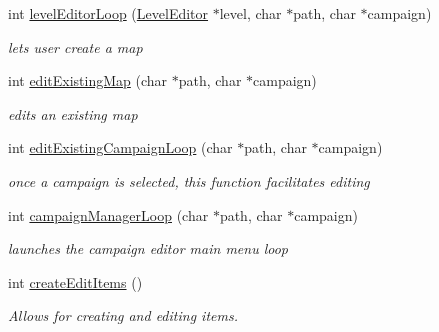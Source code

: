 \begin{DoxyCompactItemize}
\hypertarget{class_game_loops_acda39f058e280040296d03f306fbb5f8}{}\label{class_game_loops_acda39f058e280040296d03f306fbb5f8} 
int \hyperlink{class_game_loops_acda39f058e280040296d03f306fbb5f8}{level\+Editor\+Loop} (\hyperlink{class_level_editor}{Level\+Editor} $\ast$level, char $\ast$path, char $\ast$campaign)
\begin{DoxyCompactList}\small\item\em lets user create a map \end{DoxyCompactList}\item 
\hypertarget{class_game_loops_a2874d34df0e78bb7b2ed1ffb95c0858e}{}\label{class_game_loops_a2874d34df0e78bb7b2ed1ffb95c0858e} 
int \hyperlink{class_game_loops_a2874d34df0e78bb7b2ed1ffb95c0858e}{edit\+Existing\+Map} (char $\ast$path, char $\ast$campaign)
\begin{DoxyCompactList}\small\item\em edits an existing map \end{DoxyCompactList}\item 
\hypertarget{class_game_loops_a4b51acac6c216a920ae948bf5d60e303}{}\label{class_game_loops_a4b51acac6c216a920ae948bf5d60e303} 
int \hyperlink{class_game_loops_a4b51acac6c216a920ae948bf5d60e303}{edit\+Existing\+Campaign\+Loop} (char $\ast$path, char $\ast$campaign)
\begin{DoxyCompactList}\small\item\em once a campaign is selected, this function facilitates editing \end{DoxyCompactList}\item 
\hypertarget{class_game_loops_a653666df83695774b11c7ee483a5944b}{}\label{class_game_loops_a653666df83695774b11c7ee483a5944b} 
int \hyperlink{class_game_loops_a653666df83695774b11c7ee483a5944b}{campaign\+Manager\+Loop} (char $\ast$path, char $\ast$campaign)
\begin{DoxyCompactList}\small\item\em launches the campaign editor main menu loop \end{DoxyCompactList}\item 
\hypertarget{class_game_loops_a89a697c5e7d1542c788c6e66c9699494}{}\label{class_game_loops_a89a697c5e7d1542c788c6e66c9699494} 
int \hyperlink{class_game_loops_a89a697c5e7d1542c788c6e66c9699494}{create\+Edit\+Items} ()
\begin{DoxyCompactList}\small\item\em Allows for creating and editing items. \end{DoxyCompactList}\item 

\end{DoxyCompactItemize}
